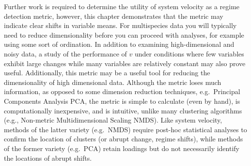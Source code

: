 \documentclass[12pt,twoside,openany]{reedthesis}
\begin{document}
Further work is required to determine the utility of system velocity as a regime detection metric, however, this chapter demonstrates that the metric may indicate clear shifts in variable means. For multispecies data you will typically need to reduce dimensionality before you can proceed with analyses, for example using some sort of ordination. In addition to examining high-dimensional and noisy data, a study of the performance of \(v\) under conditions where few variables exhibit large changes while many variables are relatively constant may also prove useful. Additionally, this metric may be a useful tool for reducing the dimensionality of high dimensional data. Although the metric loses much information, as opposed to some dimension reduction techniques, e.g.~Principal Components Analysis PCA, the metric is simple to calculate (even by hand), is computationally inexpensive, and is intuitive, unlike many clustering algorithms (e.g., Non-metric Multidimensional Scaling NMDS). Like system velocity, methods of the latter variety (e.g.~NMDS) require post-hoc statistical analyses to confirm the location of clusters (or abrupt change, regime shifts), while methods of the former variety (e.g.~PCA) retain loadings but do not necessarily identify the locations of abrupt shifts.
\end{document}
